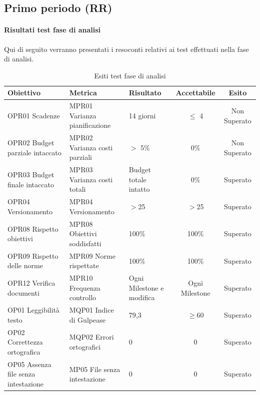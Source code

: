 \documentclass[../piano_di_qualifica.tex]{subfiles}
\begin{document}
\subsection{Primo periodo (RR)}
\label{sub:periodo-RR}
\paragraph{Risultati test fase di analisi}
Qui di seguito verranno presentati i resoconti relativi ai test effettuati nella fase di analisi. \par

\begin{table}[!ht]
	\centering
	\begin{tabular}{|p{4cm}|p{4cm}|l|c|c|}
		\hline
		\rowcolor{lightgray}
		\textbf{Obiettivo}            			& \textbf{Metrica}              & \textbf{Risultato}                    & \textbf{Accettabile} & \textbf{Esito} \\
		\hline
		OPR01 Scadenze		        			& MPR01 Varianza pianificazione & 14 giorni                             & $\leq$ 4           & Non Superato   \\
		OPR02 Budget parziale intaccato        	& MPR02 Varianza costi parziali & $>$ 5\%								& 0\%                  & Non Superato   \\
		OPR03 Budget finale intaccato        	& MPR03 Varianza costi totali   & Budget totale intatto					& 0\%                  & Superato       \\
		OPR04 Versionamento						& MPR04 Versionamento			& $>$25									&$>$25					& Superato	\\
		OPR08 Rispetto obiettivi      			& MPR08 Obiettivi soddisfatti   & 100\%                                 & 100\%                & Superato       \\
		OPR09 Rispetto delle norme   			& MPR09 Norme rispettate        & 100\%                                 & 100\%                & Superato       \\
		OPR12 Verifica documenti      			& MPR10 Frequenza controllo     & Ogni Milestone e modifica         	& Ogni Milestone       & Superato       \\
		OP01 Leggibilità testo       			& MQP01 Indice di Gulpease      & 79,3                                  & \(\ge 60\)           & Superato       \\
		OP02 Correttezza ortografica 			& MQP02 Errori ortografici      & 0                                     & 0                    & Superato       \\
		OP05 Assenza file senza intestazione	& MP05 File senza intestazione 	& 0										& 0						& Superato		\\
		\hline
	\end{tabular}
	\caption{Esiti test fase di analisi}
\end{table}
\end{document}
